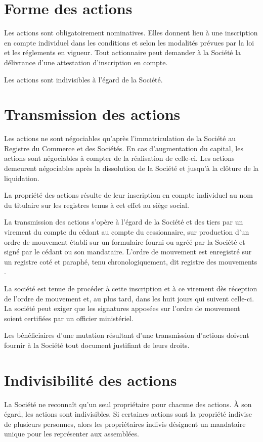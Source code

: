 \documentclass[a4paper,12pt]{report}
\begin{document}
\section{Forme des actions}
Les actions sont obligatoirement nominatives. 
Elles donnent lieu à une inscription en compte individuel dans les conditions et selon les modalités prévues par la loi et les réglements en vigueur. 
Tout actionnaire peut demander à la Société la délivrance d'une attestation d'inscription en compte.

Les actions sont indivisibles à l'égard de la Société.

\section{Transmission des actions}
Les actions ne sont négociables qu'après l'immatriculation de la Société au Registre du Commerce et des Sociétés. 
En cas d'augmentation du capital, les actions sont négociables à compter de la réalisation de celle-ci. 
Les actions demeurent négociables après la dissolution de la Société et jusqu'à la clôture de la liquidation.

La propriété des actions résulte de leur inscription en compte individuel au nom du titulaire sur les registres tenus à cet effet au siège social.

La transmission des actions s'opère à l'égard de la Société et des tiers par un virement du compte du cédant au compte du cessionnaire, 
sur production d'un ordre de mouvement établi sur un formulaire fourni ou agréé par la Société et signé par le cédant ou son mandataire. 
L'ordre de mouvement est enregistré sur un registre coté et paraphé, tenu chronologiquement, dit \og registre des mouvements \fg{}.

La société est tenue de procéder à cette inscription et à ce virement dès réception de l'ordre de mouvement et, au plus tard, dans les huit jours qui suivent celle-ci. 
La société peut exiger que les signatures apposées sur l'ordre de mouvement soient certifiées par un officier ministériel.

Les bénéficiaires d'une mutation résultant d'une transmission d'actions doivent fournir à la Société tout document justifiant de leurs droits.

\section{Indivisibilité des actions}
La Société ne reconnaît qu'un seul propriétaire pour chacune des actions. À son égard, les actions sont indivisibles. 
Si certaines actions sont la propriété indivise de plusieurs personnes, 
alors les propriétaires indivis désignent un mandataire unique pour les représenter aux assemblées.
\end{document}
